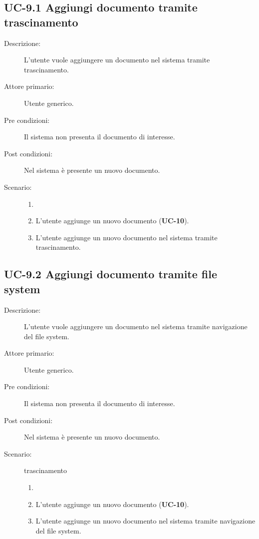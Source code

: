 \subsection{UC-9.1 Aggiungi documento tramite trascinamento}
\begin{description}
    \item[Descrizione:] L'utente vuole aggiungere un documento nel sistema tramite trascinamento.
    \item[Attore primario:] Utente generico.
    \item[Pre condizioni:] Il sistema non presenta il documento di interesse.
    \item[Post condizioni:] Nel sistema è presente un nuovo documento.
    \item[Scenario:] 
    \begin{enumerate}
        \item[]
        \item L’utente aggiunge un nuovo documento (\textbf{UC-10}).
        \item L'utente aggiunge un nuovo documento nel sistema tramite trascinamento.
    \end{enumerate}
\end{description}

\subsection{UC-9.2 Aggiungi documento tramite file system}
\begin{description}
    \item[Descrizione:] L'utente vuole aggiungere un documento nel sistema tramite navigazione del file system.
    \item[Attore primario:] Utente generico.
    \item[Pre condizioni:] Il sistema non presenta il documento di interesse.
    \item[Post condizioni:] Nel sistema è presente un nuovo documento.
    \item[Scenario:] trascinamento
    \begin{enumerate}
        \item[]
        \item L’utente aggiunge un nuovo documento (\textbf{UC-10}).
        \item L'utente aggiunge un nuovo documento nel sistema tramite navigazione del file system.
    \end{enumerate}
\end{description}

